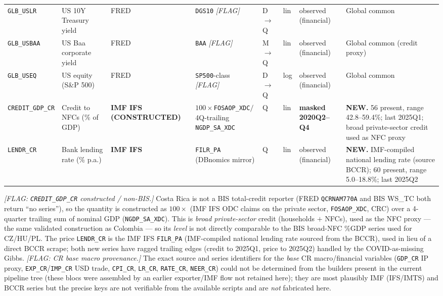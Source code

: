 {\begin{longtable}{@{}p{2.0cm}p{2.7cm}p{1.4cm}p{2.8cm}p{0.7cm}p{0.85cm}p{1.5cm}p{2.3cm}@{}}
\texttt{GLB\_USLR}  & US 10Y Treasury yield         & FRED & \texttt{DGS10} \textit{[FLAG]}                          & D$\to$Q & lin & observed (financial) & Global common \\
\texttt{GLB\_USBAA} & US Baa corporate yield        & FRED & \texttt{BAA} \textit{[FLAG]}                            & M$\to$Q & lin & observed (financial) & Global common (credit proxy) \\
\texttt{GLB\_USEQ}  & US equity (S\&P 500)          & FRED & \texttt{SP500}-class \textit{[FLAG]}                    & D$\to$Q & log & observed (financial) & Global common \\
\texttt{CREDIT\_GDP\_CR} & Credit to NFCs (\% of GDP) & \textbf{IMF IFS (CONSTRUCTED)} & $100\times$\texttt{FOSAOP\_XDC}$/$4Q-trailing \texttt{NGDP\_SA\_XDC} & Q & lin & \textbf{masked 2020Q2--Q4} & \textbf{NEW.} 56 present, range 42.8--59.4\%; last 2025Q1; broad private-sector credit used as NFC proxy \\
\texttt{LENDR\_CR}  & Bank lending rate (\% p.a.)   & \textbf{IMF IFS} & \texttt{FILR\_PA} (DBnomics mirror)                    & Q & lin & observed (financial) & \textbf{NEW.} IMF-compiled national lending rate (source BCCR); 60 present, range 5.0--18.8\%; last 2025Q2 \\
\end{longtable}}

\noindent\textit{[FLAG: \texttt{CREDIT\_GDP\_CR} constructed / non-BIS.]}
Costa Rica is not a BIS total-credit reporter (FRED \texttt{QCRNAM770A}
and BIS WS\_TC both return ``no series''), so the quantity is constructed
as $100\times$ (IMF IFS ODC claims on the private sector, \texttt{FOSAOP\_XDC},
CRC) over a 4-quarter trailing sum of nominal GDP (\texttt{NGDP\_SA\_XDC}).
This is \emph{broad private-sector} credit (households $+$ NFCs), used as
the NFC proxy --- the same validated construction as Colombia --- so its
\emph{level} is not directly comparable to the BIS broad-NFC \%GDP series
used for CZ/HU/PL.  The price \texttt{LENDR\_CR} is the IMF IFS
\texttt{FILR\_PA} (IMF-compiled national lending rate sourced from the
BCCR), used in lieu of a direct BCCR scrape; both new series have ragged
trailing edges (credit to 2025Q1, price to 2025Q2) handled by the
COVID-as-missing Gibbs.
\textit{[FLAG: CR base macro provenance.]} The exact source and series
identifiers for the \emph{base} CR macro/financial variables
(\texttt{GDP\_CR} IP proxy, \texttt{EXP\_CR}/\texttt{IMP\_CR} USD trade,
\texttt{CPI\_CR}, \texttt{LR\_CR}, \texttt{RATE\_CR}, \texttt{NEER\_CR})
could not be determined from the builders present in the current pipeline
tree (these blocs were assembled by an earlier exporter/IMF flow not
retained here); they are most plausibly IMF (IFS/IMTS) and BCCR series but
the precise keys are not verifiable from the available scripts and are
\emph{not} fabricated here.

